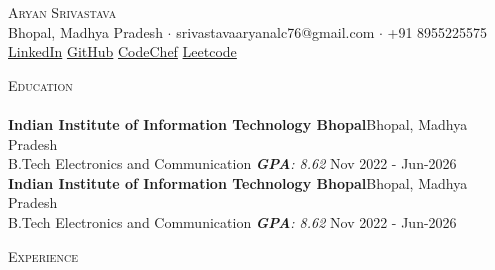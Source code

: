 \documentclass[a4paper]{article}
\newcommand{\lineunder} {
    \vspace*{-8pt} \\
    \hspace*{-18pt} \hrulefill \\
}
\newcommand{\header} [1] {
    {\hspace*{-18pt}\vspace*{6pt} \textsc{#1}}
    \vspace*{-6pt} \lineunder
}
\begin{document}
\vspace*{-40pt}

    

\vspace*{-15pt}
\begin{center}
	{\Huge \scshape {Aryan Srivastava}}\\
	Bhopal, Madhya Pradesh $\cdot$ srivastavaaryanalc76@gmail.com $\cdot$ +91 8955225575 \\
	\href{https://www.linkedin.com/in/aryan-srivastava-560b91255/}{\color{blue}LinkedIn}   \textbar{} \href{https://github.com/Aryan123-rgb}{\color{blue}GitHub}
	\textbar{} \href{https://www.codechef.com/users/neat_tiger_70}{\color{blue}CodeChef}
    \textbar{} \href{https://codeforces.com/profile/narutouzumaki16092003}{\color{blue}Leetcode}
\end{center}

\header{Education}
\textbf{Indian Institute of Information Technology Bhopal}\hfill Bhopal, Madhya Pradesh\\
B.Tech Electronics and Communication \textit{\textbf{GPA}: 8.62} \hfill Nov 2022 - Jun-2026\\
\vspace{2mm}
\textbf{Indian Institute of Information Technology Bhopal}\hfill Bhopal, Madhya Pradesh\\
B.Tech Electronics and Communication \textit{\textbf{GPA}: 8.62} \hfill Nov 2022 - Jun-2026\\
\vspace{2mm}
\header{Experience}
\end{document}
